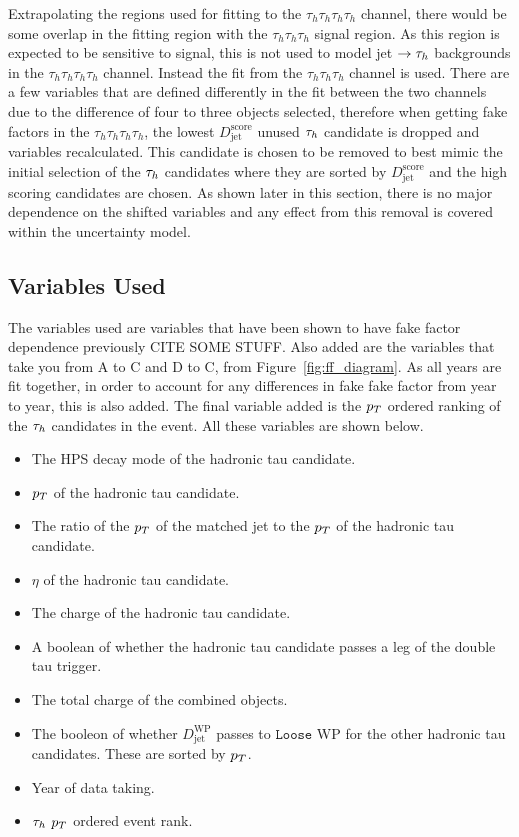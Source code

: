 Extrapolating the regions used for fitting to the $\tau_h \tau_h \tau_h \tau_h$ channel, there would be some overlap in the fitting region with the $\tau_h \tau_h \tau_h$ signal region. 
As this region is expected to be sensitive to signal, this is not used to model jet $\rightarrow\tau_{h}$ backgrounds in the $\tau_h \tau_h \tau_h \tau_h$ channel. 
Instead the fit from the $\tau_h \tau_h \tau_h$ channel is used. 
There are a few variables that are defined differently in the fit between the two channels due to the difference of four to three objects selected, therefore when getting fake factors in the $\tau_h \tau_h \tau_h \tau_h$, the lowest $D_{\text{jet}}^{\text{score}}$ unused $\tau_{h}$ candidate is dropped and variables recalculated. 
This candidate is chosen to be removed to best mimic the initial selection of the $\tau_{h}$ candidates where they are sorted by $D_{\text{jet}}^{\text{score}}$ and the high scoring candidates are chosen. 
As shown later in this section, there is no major dependence on the shifted variables and any effect from this removal is covered within the uncertainty model. \\

\subsection{Variables Used}

The variables used are variables that have been shown to have fake factor dependence previously CITE SOME STUFF. 
Also added are the variables that take you from A to C and D to C, from Figure~\ref{fig:ff_diagram}. 
As all years are fit together, in order to account for any differences in fake fake factor from year to year, this is also added. 
The final variable added is the $p_{T}$ ordered ranking of the $\tau_{h}$ candidates in the event.
All these variables are shown below.

\begin{itemize}
\item The HPS decay mode of the hadronic tau candidate.
\item $p_{T}$ of the hadronic tau candidate.
\item The ratio of the $p_{T}$  of the matched jet to the $p_{T}$ of the hadronic tau candidate.
\item $\eta$ of the hadronic tau candidate.
\item The charge of the hadronic tau candidate.
\item A boolean of whether the hadronic tau candidate passes a leg of the double tau trigger.
\item The total charge of the combined objects.
\item The booleon of whether $D_{\text{jet}}^{\text{WP}}$ passes to $\texttt{Loose}$ WP for the other hadronic tau candidates. These are sorted by $p_{T}$.
\item Year of data taking.
\item $\tau_{h}$ $p_{T}$ ordered event rank.
\end{itemize}

